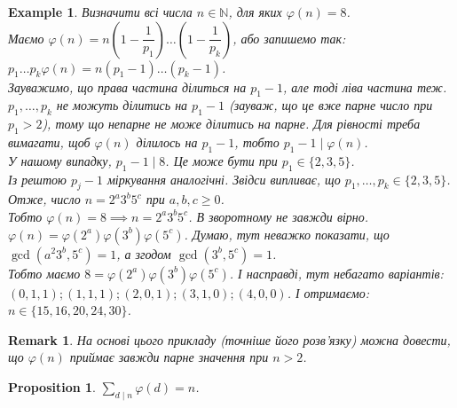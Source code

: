 \documentclass[a4paper, 10pt]{article}
\theoremstyle{theoremdd}
\theoremstyle{theoremdd}
\theoremstyle{theoremdd}
\theoremstyle{theoremdd}
\newtheorem{example}[theorem]{Example}
\theoremstyle{theoremdd}
\newtheorem{proposition}[theorem]{Proposition}
\theoremstyle{theoremdd}
\newtheorem{remark}[theorem]{Remark}
\theoremstyle{theoremdd}
\theoremstyle{theoremdd}
\begin{document}
\begin{example}
Визначити всі числа $n \in \mathbb{N}$, для яких $\varphi(n) = 8$.\\
Маємо $\varphi(n) = n \left( 1 - \dfrac{1}{p_1} \right) \dots \left( 1 - \dfrac{1}{p_k} \right)$, або запишемо так:\\
$p_1 \dots p_k \varphi(n) = n(p_1-1) \dots (p_k-1)$.\\
Зауважимо, що права частина ділиться на $p_1-1$, але тоді ліва частина теж. $p_1,\dots,p_k$ не можуть ділитись на $p_1-1$ (зауваж, що це вже парне число при $p_1 > 2$), тому що непарне не може ділитись на парне. Для рівності треба вимагати, щоб $\varphi(n)$ ділилось на $p_1-1$, тобто $p_1 - 1 \mid \varphi(n)$.\\
У нашому випадку, $p_1-1 \mid 8$. Це може бути при $p_1 \in \{2,3,5\}$.\\
Із рештою $p_j - 1$ міркування аналогічні. Звідси випливає, що $p_1,\dots,p_k \in \{2,3,5\}$. Отже, число $n = 2^a 3^b 5^c$ при $a,b,c \geq 0$.\\
Тобто $\varphi(n) = 8 \implies n = 2^a3^b 5^c$. В зворотному не завжди вірно.
$\varphi(n) = \varphi(2^a) \varphi(3^b) \varphi(5^c)$. Думаю, тут неважко показати, що $\gcd(a^2 3^b, 5^c) = 1$, а згодом $\gcd(3^b,5^c) = 1$.\\
Тобто маємо $8 = \varphi(2^a) \varphi(3^b) \varphi(5^c)$. І насправді, тут небагато варіантів:\\
$(0,1,1); (1,1,1); (2,0,1); (3,1,0); (4,0,0)$. І отримаємо:\\
$n \in \{15,16,20,24,30\}$.
\end{example}

\begin{remark}
На основі цього прикладу (точніше його розв'язку) можна довести, що $\varphi(n)$ приймає завжди парне значення при $n > 2$.
\end{remark}

\begin{proposition}
$\displaystyle\sum_{d \mid n} \varphi(d) = n$.
\end{proposition}
\end{document}
